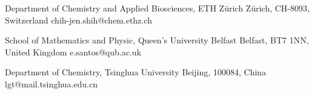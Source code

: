 
\begin{cvrefs}
  {Department of Chemistry and Applied Biosciences, ETH Z\"{u}rich}
  {Z\"{u}rich, CH-8093, Switzerland}
  {chih-jen.shih@chem.ethz.ch}
  {}

  {School of Mathematics and Physic, Queen's University Belfast}
  {Belfast, BT7 1NN, United Kingdom}
  {e.santos@qub.ac.uk}
  {}

  {Department of Chemistry, Tsinghua University}
  {Beijing, 100084, China}
  {lgt@mail.tsinghua.edu.cn}
  {}

  
\end{cvrefs}

